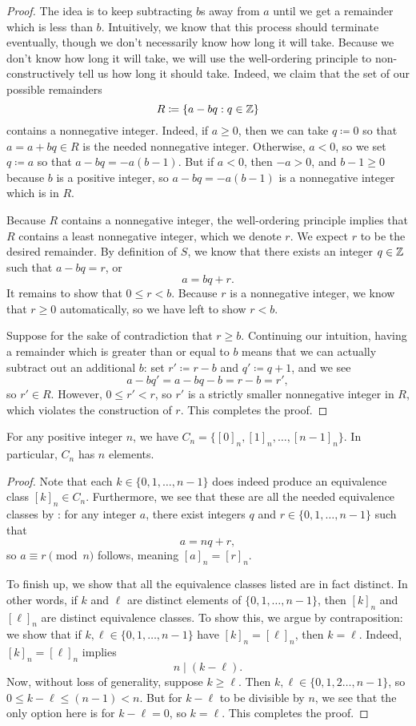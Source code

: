 \documentclass[../main.tex]{subfiles}
\begin{document}
\begin{proof}
    The idea is to keep subtracting $b$s away from $a$ until we get a remainder which is less than $b$. Intuitively, we know that this process should terminate eventually, though we don't necessarily know how long it will take. Because we don't know how long it will take, we will use the well-ordering principle to non-constructively tell us how long it should take. Indeed, we claim that the set of our possible remainders
    \[R\coloneqq\{a-bq:q\in\mathbb Z\}\]
    contains a nonnegative integer. Indeed, if $a\ge0$, then we can take $q\coloneqq0$ so that $a=a+bq\in R$ is the needed nonnegative integer. Otherwise, $a<0$, so we set $q\coloneqq a$ so that $a-bq=-a(b-1)$. But if $a<0$, then $-a>0$, and $b-1\ge0$ because $b$ is a positive integer, so $a-bq=-a(b-1)$ is a nonnegative integer which is in $R$.
    
    Because $R$ contains a nonnegative integer, the well-ordering principle implies that $R$ contains a least nonnegative integer, which we denote $r$. We expect $r$ to be the desired remainder. By definition of $S$, we know that there exists an integer $q\in\mathbb Z$ such that $a-bq=r$, or
    \[a=bq+r.\]
    It remains to show that $0\le r<b$. Because $r$ is a nonnegative integer, we know that $r\ge0$ automatically, so we have left to show $r<b$.
    
    Suppose for the sake of contradiction that $r\ge b$. Continuing our intuition, having a remainder which is greater than or equal to $b$ means that we can actually subtract out an additional $b$: set $r'\coloneqq r-b$ and $q'\coloneqq q+1$, and we see
    \[a-bq'=a-bq-b=r-b=r',\]
    so $r'\in R$. However, $0\le r'<r$, so $r'$ is a strictly smaller nonnegative integer in $R$, which violates the construction of $r$. This completes the proof.
\end{proof}
\begin{corollary}
    For any positive integer $n$, we have $C_n=\{[0]_n,[1]_n,\ldots,[n-1]_n\}$. In particular, $C_n$ has $n$ elements.
\end{corollary}
\begin{proof}
    Note that each $k\in\{0,1,\ldots,n-1\}$ does indeed produce an equivalence class $[k]_n\in C_n$. Furthermore, we see that these are all the needed equivalence classes by : for any integer $a$, there exist integers $q$ and $r\in\{0,1,\ldots,n-1\}$ such that
    \[a=nq+r,\]
    so $a\equiv r\pmod n$ follows, meaning $[a]_n=[r]_n$.
    
    To finish up, we show that all the equivalence classes listed are in fact distinct. In other words, if $k$ and $\ell$ are distinct elements of $\{0,1,\ldots,n-1\}$, then $[k]_n$ and $[\ell]_n$ are distinct equivalence classes. To show this, we argue by contraposition: we show that if $k,\ell\in\{0,1,\ldots,n-1\}$ have $[k]_n=[\ell]_n$, then $k=\ell$. Indeed, $[k]_n=[\ell]_n$ implies
    \[n\mid(k-\ell).\]
    Now, without loss of generality, suppose $k\ge\ell$. Then $k,\ell\in\{0,1,2\ldots,n-1\}$, so $0\le k-\ell\le(n-1)<n$. But for $k-\ell$ to be divisible by $n$, we see that the only option here is for $k-\ell=0$, so $k=\ell$. This completes the proof.
\end{proof}
\end{document}
